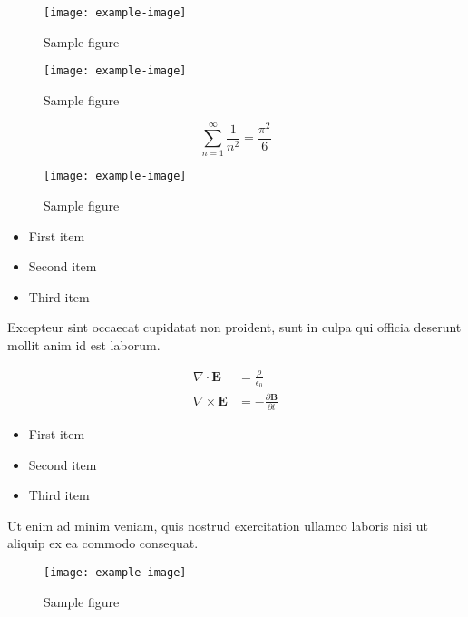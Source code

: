\documentclass{article}
\begin{document}
\begin{figure}[h]
    \centering
    \texttt{[image: example-image]}
    \caption{Sample figure}
    \label{fig:sample}
\end{figure}

\begin{figure}[h]
    \centering
    \texttt{[image: example-image]}
    \caption{Sample figure}
    \label{fig:sample}
\end{figure}

\begin{equation}
    \sum_{n=1}^{\infty} \frac{1}{n^2} = \frac{\pi^2}{6}
\end{equation}

\begin{figure}[h]
    \centering
    \texttt{[image: example-image]}
    \caption{Sample figure}
    \label{fig:sample}
\end{figure}


\begin{itemize}
\item First item
\item Second item
\item Third item
\end{itemize}

Excepteur sint occaecat cupidatat non proident, sunt in culpa qui officia deserunt mollit anim id est laborum.


\begin{align}
    \nabla \cdot \mathbf{E} &= \frac{\rho}{\epsilon_0} \\
    \nabla \times \mathbf{E} &= -\frac{\partial \mathbf{B}}{\partial t}
\end{align}

\begin{itemize}
\item First item
\item Second item
\item Third item
\end{itemize}

Ut enim ad minim veniam, quis nostrud exercitation ullamco laboris nisi ut aliquip ex ea commodo consequat.


\begin{figure}[h]
    \centering
    \texttt{[image: example-image]}
    \caption{Sample figure}
    \label{fig:sample}
\end{figure}
\end{document}
